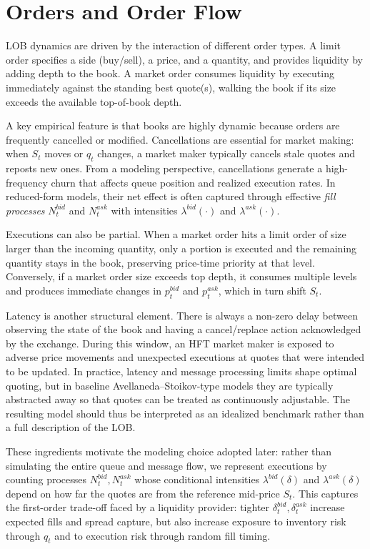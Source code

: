 \documentclass[a4paper,10pt,titlepage,oneside,openany]{book}
\theoremstyle{plain}\newtheorem{theorem}{Theorem}[chapter]
\theoremstyle{definition}\newtheorem{definition}{Definition}[chapter]
\theoremstyle{remark}\newtheorem{remark}{Remark}[chapter]
\begin{document}
\section{Orders and Order Flow}
LOB dynamics are driven by the interaction of different order types. A limit order specifies a side (buy/sell), a price, and a quantity, and provides liquidity by adding depth to the book. A market order consumes liquidity by executing immediately against the standing best quote(s), walking the book if its size exceeds the available top-of-book depth.

A key empirical feature is that books are highly dynamic because orders are frequently cancelled or modified. Cancellations are essential for market making: when $S_t$ moves or $q_t$ changes, a market maker typically cancels stale quotes and reposts new ones. From a modeling perspective, cancellations generate a high-frequency churn that affects queue position and realized execution rates. In reduced-form models, their net effect is often captured through effective \emph{fill processes} $N_t^{bid}$ and $N_t^{ask}$ with intensities $\lambda^{bid}(\cdot)$ and $\lambda^{ask}(\cdot)$.

Executions can also be partial. When a market order hits a limit order of size larger than the incoming quantity, only a portion is executed and the remaining quantity stays in the book, preserving price-time priority at that level. Conversely, if a market order size exceeds top depth, it consumes multiple levels and produces immediate changes in $p_t^{bid}$ and $p_t^{ask}$, which in turn shift $S_t$.

Latency is another structural element. There is always a non-zero delay between observing the state of the book and having a cancel/replace action acknowledged by the exchange. During this window, an HFT market maker is exposed to adverse price movements and unexpected executions at quotes that were intended to be updated. In practice, latency and message processing limits shape optimal quoting, but in baseline Avellaneda--Stoikov-type models they are typically abstracted away so that quotes can be treated as continuously adjustable. The resulting model should thus be interpreted as an idealized benchmark rather than a full description of the LOB.

These ingredients motivate the modeling choice adopted later: rather than simulating the entire queue and message flow, we represent executions by counting processes $N_t^{bid},N_t^{ask}$ whose conditional intensities $\lambda^{bid}(\delta)$ and $\lambda^{ask}(\delta)$ depend on how far the quotes are from the reference mid-price $S_t$. This captures the first-order trade-off faced by a liquidity provider: tighter $\delta_t^{bid},\delta_t^{ask}$ increase expected fills and spread capture, but also increase exposure to inventory risk through $q_t$ and to execution risk through random fill timing.
\end{document}
